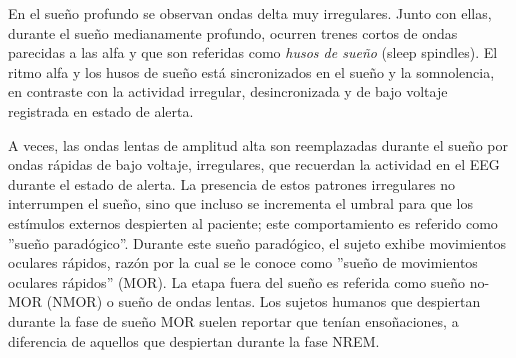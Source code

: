 

En el sue\~no profundo se observan ondas delta muy irregulares. Junto con ellas, durante el sue\~no
medianamente profundo, ocurren trenes cortos de ondas parecidas a las alfa y que son referidas como
\textit{husos de sue\~no} (sleep spindles). El ritmo alfa y los husos de sue\~no 
est\'a sincronizados en
el sue\~no y la somnolencia, en contraste con la actividad irregular, desincronizada y de bajo 
voltaje registrada en estado de alerta.


A veces,
las ondas lentas de amplitud alta son reemplazadas durante el sue\~no por ondas r\'apidas de
bajo voltaje, irregulares, que recuerdan la actividad en el EEG durante el estado de alerta.
La presencia de estos patrones irregulares no interrumpen el sue\~no, sino que 
incluso se incrementa el umbral
para que los est\'imulos externos despierten al paciente; 
este comportamiento es referido como ''sue\~no parad\'ogico''.
Durante este sue\~no parad\'ogico, el sujeto exhibe movimientos oculares r\'apidos,
raz\'on por la cual se le conoce como ''sue\~no de movimientos oculares r\'apidos'' (MOR).
La etapa fuera del sue\~no
es referida como sue\~no no-MOR (NMOR) o sue\~no de ondas lentas.
Los sujetos humanos que despiertan durante la fase de sue\~no MOR suelen reportar que
ten\'ian enso\~naciones, a diferencia de aquellos que despiertan durante la fase NREM.

